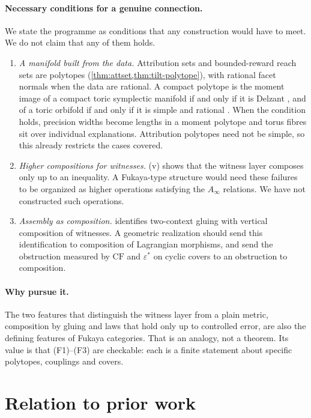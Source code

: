 \documentclass[11pt]{article}
\theoremstyle{definition}
\theoremstyle{remark}
\begin{document}
\paragraph{Necessary conditions for a genuine connection.} We state the programme as conditions that
any construction would have to meet. We do not claim that any of them holds.
\begin{enumerate}[label=(F\arabic*),leftmargin=*]
\item \emph{A manifold built from the data.} Attribution sets and bounded-reward reach sets are
  polytopes (\cref{thm:attset,thm:tilt-polytope}), with rational facet normals when the data are
  rational. A compact polytope is the moment image of a compact toric symplectic manifold if and only if
  it is Delzant \cite{Delzant1988}, and of a toric orbifold if and only if it is simple and rational
  \cite{LermanTolman1997}. When the condition holds, precision widths become lengths in a moment
  polytope and torus fibres sit over individual explanations. Attribution polytopes need not be
  simple, so this already restricts the cases covered.
\item \emph{Higher compositions for witnesses.} (v) shows that the witness layer
  composes only up to an inequality. A Fukaya-type structure would need these failures to be organized
  as higher operations satisfying the $A_\infty$ relations. We have not constructed such operations.
\item \emph{Assembly as composition.}  identifies two-context gluing with
  vertical composition of witnesses. A geometric realization should send this identification to
  composition of Lagrangian morphisms, and send the obstruction measured by $\mathrm{CF}$ and
  $\varepsilon^*$ on cyclic covers to an obstruction to composition.
\end{enumerate}

\paragraph{Why pursue it.} The two features that distinguish the witness layer from a plain metric,
composition by gluing and laws that hold only up to controlled error, are also the defining features of
Fukaya categories. That is an analogy, not a theorem. Its value is that (F1)--(F3) are checkable: each is
a finite statement about specific polytopes, couplings and covers.

\section{Relation to prior work}\label{sec:related}
\end{document}

